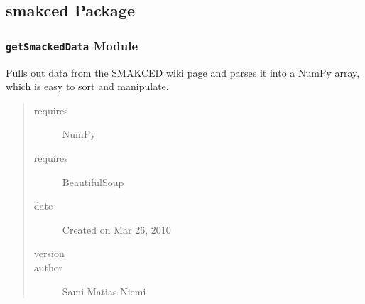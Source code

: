 \documentclass[letterpaper,10pt,english]{sphinxmanual}
\begin{document}
\begin{fulllineitems}
\label{SamPy.sandbox:SamPy.sandbox.simpleMultiprocessingExample.aFunction}
\end{fulllineitems}



\subsection{smakced Package}
\label{SamPy.smakced:smakced-package}\label{SamPy.smakced::doc}

\subsubsection{\texttt{getSmackedData} Module}
\label{SamPy.smakced:getsmackeddata-module}\label{SamPy.smakced:module-SamPy.smakced.getSmackedData}
Pulls out data from the SMAKCED wiki page
and parses it into a NumPy array, which is
easy to sort and manipulate.
\begin{quote}\begin{description}
\item[{requires}] \leavevmode
NumPy

\item[{requires}] \leavevmode
BeautifulSoup

\item[{date}] \leavevmode
Created on Mar 26, 2010

\item[{version}] 

\item[{author}] \leavevmode
Sami-Matias Niemi

\end{description}\end{quote}

\end{document}
